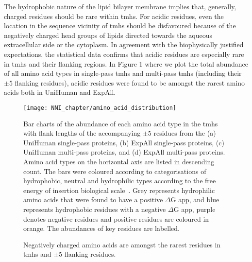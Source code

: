 The hydrophobic nature of the lipid bilayer membrane implies that, generally, charged residues should be rare within \gls{tmh}s. For acidic residues, even the location in the sequence vicinity of \gls{tmh}s should be disfavoured because of the negatively charged head groups of lipids directed towards the aqueous extracellular side or the cytoplasm. In agreement with the biophysically justified expectations, the statistical data confirms that acidic residues are especially rare in \gls{tmh}s and their flanking regions. In Figure 1 where we plot the total abundance of all amino acid types in single-pass \gls{tmh}s and multi-pass \gls{tmh}s (including their $\pm$5 flanking residues), acidic residues were found to be amongst the rarest amino acids both in UniHuman and ExpAll.

\begin{figure}[!ht]
\centering
\texttt{[image: NNI\_chapter/amino\_acid\_distribution]}
\caption{ Negatively charged amino acids are amongst the rarest residues in \gls{tmh}s and $\pm$5 flanking residues.}

\medskip
\small
\justify
Bar charts of the abundance of each amino acid type in the \gls{tmh}s with flank lengths of the accompanying $\pm$5 residues from the (a) UniHuman single-pass proteins, (b) ExpAll single-pass proteins, (c) UniHuman multi-pass proteins, and (d) ExpAll multi-pass proteins. Amino acid types on the horizontal axis are listed in descending count. The bars were coloured according to categorisations of hydrophobic, neutral and hydrophilic types according to the free energy of insertion biological scale~\cite{Hessa2005}. Grey represents hydrophilic amino acids that were found to have a positive $\Delta$G app, and blue represents hydrophobic residues with a negative $\Delta$G app, purple denotes negative residues and positive residues are coloured in orange. The abundances of key residues are labelled.
\label{fig:amino_acid_distribution}
\end{figure}

